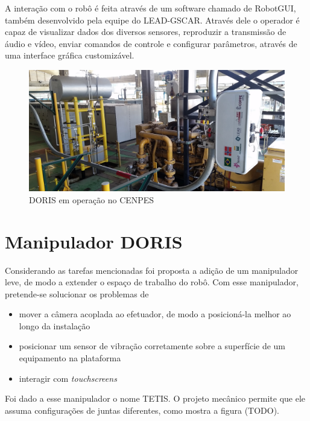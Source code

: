 A interação com o robô é feita através de um software chamado de RobotGUI, também desenvolvido pela equipe do LEAD-GSCAR. Através dele o operador é capaz de visualizar dados dos diversos sensores, reproduzir a transmissão de áudio e vídeo, enviar comandos de controle e configurar parâmetros, através de uma interface gráfica customizável. 

\begin{figure}[!ht]
\centering
  \includegraphics[width=\linewidth]{./img/cenpes_field.jpg}
  \caption{DORIS em operação no CENPES}
  \label{fig:cenpes_doris}
\end{figure}%

\section{Manipulador DORIS}
Considerando as tarefas mencionadas foi proposta a adição de um manipulador leve, de modo a extender o espaço de trabalho do robô. Com esse manipulador, pretende-se solucionar os problemas de
\begin{itemize}
\item mover a câmera acoplada ao efetuador, de modo a posicioná-la melhor ao longo da instalação
\item posicionar um sensor de vibração corretamente sobre a superfície de um equipamento na plataforma
\item interagir com \textit{touchscreens}
\end{itemize}

Foi dado a esse manipulador o nome TETIS. O projeto mecânico permite que ele assuma configurações de juntas diferentes, como mostra a figura (TODO). 

